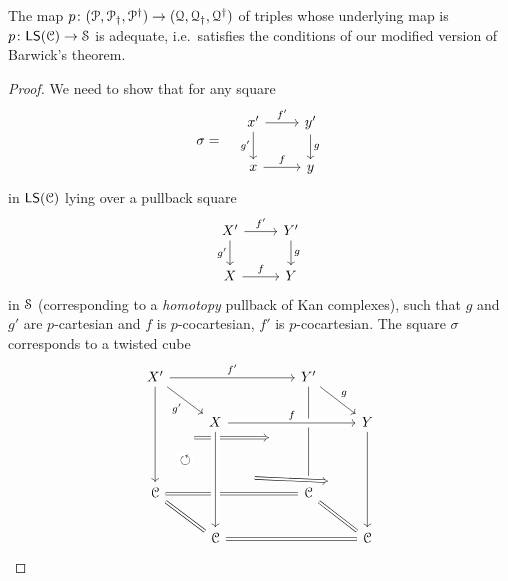\documentclass[main.tex]{subfiles}
\begin{document}
\begin{proposition}
  The map $p\colon \triple{P} \to \triple{Q}$ of triples whose underlying map is $p\colon \LS(\category{C}) \to \S$ is adequate, i.e.\ satisfies the conditions of our modified version of Barwick's theorem.
\end{proposition}
\begin{proof}
  We need to show that for any square
  \begin{equation*}
    \sigma =\quad
    \begin{tikzcd}
      x'
      \arrow[r, "f'"]
      \arrow[d, swap, "g'"]
      & y'
      \arrow[d, "g"]
      \\
      x
      \arrow[r, "f"]
      & y
    \end{tikzcd}
  \end{equation*}
  in $\LS(\category{C})$ lying over a pullback square
  \begin{equation*}
    \begin{tikzcd}
      X'
      \arrow[r, "f'"]
      \arrow[d, swap, "g'"]
      & Y'
      \arrow[d, "g"]
      \\
      X
      \arrow[r, "f"]
      & Y
    \end{tikzcd}
  \end{equation*}
  in $\S$ (corresponding to a \emph{homotopy} pullback of Kan complexes), such that $g$ and $g'$ are $p$-cartesian and $f$ is $p$-cocartesian, $f'$ is $p$-cocartesian. The square $\sigma$ corresponds to a twisted cube
  \begin{equation*}
    \begin{tikzcd}
      X'
      \arrow[rrr, "f'"]
      \arrow[dr, ""{name=TL, below}, "g'"{swap}]
      \arrow[ddd, ""{name=R1, below}]
      &&& Y'
      \arrow[ddd, ""{name=L2, below}, ""{name=R2, above}]
      \arrow[dr, ""{name=TR, below}, "g"]
      \arrow[from=R1, to=L2, Rightarrow, shorten=6ex]
      \\
      & X
      \arrow[rrr, crossing over, "f"]
      &&& Y
      \arrow[ddd, ""{name=L4, below}"]
      \\
      \\
      \category{C}
      &&& \category{C}
      \arrow[lll, equals]
      \\
      & \category{C}
      \arrow[from=uuu, crossing over, ""{name=L3, below}, ""{name=R3, above}]
      \arrow[ul, equals]
      &&& \category{C}
      \arrow[lll, equals]
      \arrow[ul, equals]
      \arrow[from=R1, to=L3, phantom, "\circlearrowleft"{description}]
      \arrow[from=R3, to=L4, Rightarrow, crossing over, shorten=6ex]

\end{tikzcd}
\end{equation*}
\end{proof}
\end{document}
